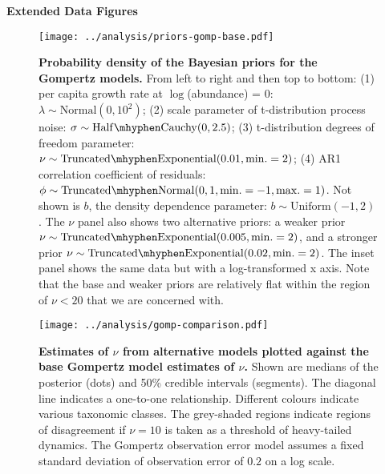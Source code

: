 \clearpage

\textbf{Extended Data Figures}

\renewcommand{\figurename}{\textbf{Extended Data Fig.}}

\begin{figure}[htbp]
\begin{center}
\texttt{[image: ../analysis/priors-gomp-base.pdf]}

\caption{
  \textbf{Probability density of the Bayesian priors for the Gompertz models.} From
  left to right and then top to bottom: (1) per capita growth rate at
  $\log$(abundance) = $0$: $\lambda \sim \mathrm{Normal}(0, 10^2)$; (2) scale
  parameter of t-distribution process noise: $\sigma \sim \mathrm{Half\mhyphen
    Cauchy} (0, 2.5)$; (3) t-distribution degrees of freedom parameter: $\nu
  \sim \mathrm{Truncated\mhyphen Exponential}(0.01, \mathrm{min.} = 2)$; (4)
  AR1 correlation coefficient of residuals: $\phi \sim \mathrm{Truncated
    \mhyphen Normal}(0, 1, \mathrm{min.} = -1, \mathrm{max.} = 1)$. Not shown
  is $b$, the density dependence parameter: $b \sim \mathrm{Uniform}(-1, 2)$.
  The $\nu$ panel also shows two alternative priors: a weaker prior $\nu \sim
  \mathrm{Truncated\mhyphen Exponential}(0.005, \mathrm{min.} = 2)$, and a
  stronger prior $\nu \sim \mathrm{Truncated\mhyphen Exponential}(0.02,
  \mathrm{min.} = 2)$. The inset panel shows the same data but with a
  log-transformed x axis. Note that the base and weaker priors are relatively
  flat within the region of $\nu < 20$ that we are concerned with. }

\label{fig:priors}
\end{center}
\end{figure}

\clearpage

\begin{figure}[htbp]
\begin{center}
\texttt{[image: ../analysis/gomp-comparison.pdf]}

\caption{\textbf{Estimates of $\nu$ from alternative models
  plotted against the base Gompertz model estimates of $\nu$.} Shown are
  medians of the posterior (dots) and 50\% credible intervals (segments). The
  diagonal line indicates a one-to-one relationship. Different colours
  indicate various taxonomic classes. The grey-shaded regions indicate regions
  of disagreement if $\nu = 10$ is taken as a threshold of heavy-tailed
  dynamics. The Gompertz observation error model assumes a fixed standard
  deviation of observation error of $0.2$ on a log scale.}

\label{fig:alt}
\end{center}
\end{figure}

